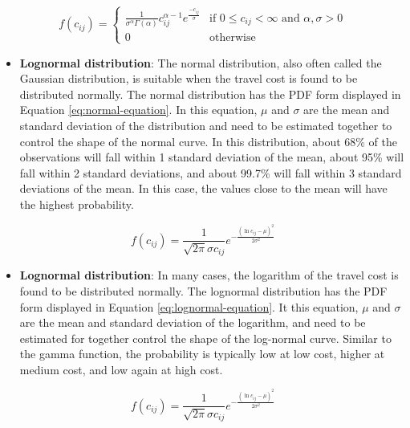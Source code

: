\documentclass[preprint, 3p,
authoryear]{elsarticle} %
\providecommand{\tightlist}{%
  \setlength{\itemsep}{0pt}\setlength{\parskip}{0pt}}
\begin{document}
\begin{equation}
f(c_{ij}) = 
   \begin{cases}
\frac{1}{\sigma^\alpha\Gamma(\alpha)} c_{ij}^{\alpha-1} e^{\frac{-c_{ij}}{\sigma}} & \text{if } 0 \leq c_{ij} <      \infty  \text{ and } \alpha, \sigma > 0 \\ 0 & \text{otherwise}
   \end{cases}
\label{eq:gamma-equation}
\end{equation}

\begin{itemize}
\tightlist
\item
  \textbf{Lognormal distribution}: The normal distribution, also often
  called the Gaussian distribution, is suitable when the travel cost is
  found to be distributed normally. The normal distribution has the PDF
  form displayed in Equation \ref{eq:normal-equation}. In this equation,
  \(\mu\) and \(\sigma\) are the mean and standard deviation of the
  distribution and need to be estimated together to control the shape of
  the normal curve. In this distribution, about 68\% of the observations
  will fall within 1 standard deviation of the mean, about 95\% will
  fall within 2 standard deviations, and about 99.7\% will fall within 3
  standard deviations of the mean. In this case, the values close to the
  mean will have the highest probability.
\end{itemize}

\begin{equation}
f(c_{ij}) = \frac{1}{\sqrt{2\pi} \sigma c_{ij}} e^{-\frac{(\ln c_{ij} - \mu)^2}{2\sigma^2}}
\label{eq:normal-equation}
\end{equation}

\begin{itemize}
\tightlist
\item
  \textbf{Lognormal distribution}: In many cases, the logarithm of the
  travel cost is found to be distributed normally. The lognormal
  distribution has the PDF form displayed in Equation
  \ref{eq:lognormal-equation}. It this equation, \(\mu\) and \(\sigma\)
  are the mean and standard deviation of the logarithm, and need to be
  estimated for together control the shape of the log-normal curve.
  Similar to the gamma function, the probability is typically low at low
  cost, higher at medium cost, and low again at high cost.
\end{itemize}

\begin{equation}
f(c_{ij}) = \frac{1}{\sqrt{2\pi} \sigma c_{ij}} e^{-\frac{(\ln c_{ij} - \mu)^2}{2\sigma^2}}
\label{eq:lognormal-equation}
\end{equation}
\end{document}
